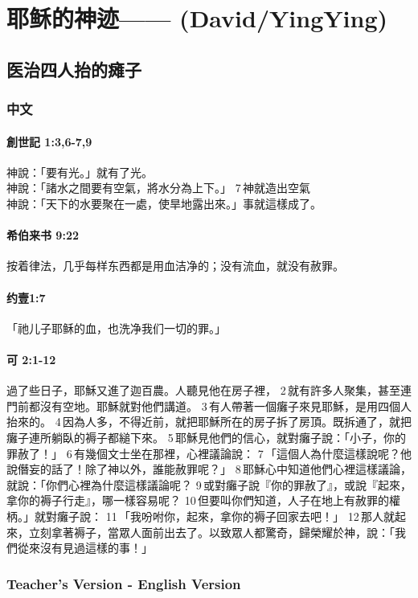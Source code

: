 \chapter{耶稣的神迹—— (David/YingYing)}

\section{医治四人抬的瘫子}
\subsection{中文}

\subsubsection{創世記 1:3,6-7,9}
神說：「要有光。」就有了光。\\
神說：「諸水之間要有空氣，將水分為上下。」 7 神就造出空氣\\
神說：「天下的水要聚在一處，使旱地露出來。」事就這樣成了。
\subsubsection{希伯来书 9:22}
按着律法，几乎每样东西都是用血洁净的；没有流血，就没有赦罪。
\subsubsection{约壹1:7}
「祂儿子耶稣的血，也洗净我们一切的罪。」
\subsubsection{可 2:1-12}
過了些日子，耶穌又進了迦百農。人聽見他在房子裡， 2 就有許多人聚集，甚至連門前都沒有空地。耶穌就對他們講道。 3 有人帶著一個癱子來見耶穌，是用四個人抬來的。 4 因為人多，不得近前，就把耶穌所在的房子拆了房頂。既拆通了，就把癱子連所躺臥的褥子都縋下來。 5 耶穌見他們的信心，就對癱子說：「小子，你的罪赦了！」 6 有幾個文士坐在那裡，心裡議論說： 7 「這個人為什麼這樣說呢？他說僭妄的話了！除了神以外，誰能赦罪呢？」 8 耶穌心中知道他們心裡這樣議論，就說：「你們心裡為什麼這樣議論呢？ 9 或對癱子說『你的罪赦了』，或說『起來，拿你的褥子行走』，哪一樣容易呢？ 10 但要叫你們知道，人子在地上有赦罪的權柄。」就對癱子說： 11 「我吩咐你，起來，拿你的褥子回家去吧！」 12 那人就起來，立刻拿著褥子，當眾人面前出去了。以致眾人都驚奇，歸榮耀於神，說：「我們從來沒有見過這樣的事！」


\newpage
\Large
\subsection{\LARGE{Teacher's Version - English Version}}
\large
\vspace{.25cm}
